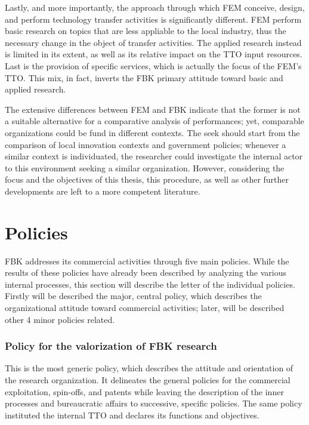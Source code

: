 Lastly, and more importantly, the approach through which FEM conceive, design, and perform technology transfer activities is significantly different. FEM perform basic research on topics that are less appliable to the local industry, thus the necessary change in the object of transfer activities. The applied research instead is limited in its extent, as well as its relative impact on the TTO input resources. Last is the provision of specific services, which is actually the focus of the FEM's TTO. This mix, in fact, inverts the FBK primary attitude toward basic and applied research.

The extensive differences between FEM and FBK indicate that the former is not a suitable alternative for a comparative analysis of performances; yet, comparable organizations could be fund in different contexts. The seek should start from the comparison of local innovation contexts and government policies; whenever a similar context is individuated, the researcher could investigate the internal actor to this environment seeking a similar organization. However, considering the focus and the objectives of this thesis, this procedure, as well as other further developments are left to a more competent literature.

\section{Policies}

FBK addresses its commercial activities through five main policies. While the results of these policies have already been described by analyzing the various internal processes, this section will describe the letter of the individual policies. Firstly will be described the major, central policy, which describes the organizational attitude toward commercial activities; later, will be described other 4 minor policies related.

\subsubsection{Policy for the valorization of FBK research}

This is the most generic policy, which describes the attitude and orientation of the research organization. It delineates the general policies for the commercial exploitation, spin-offs, and patents while leaving the description of the inner processes and bureaucratic affairs to successive, specific policies. The same policy instituted the internal TTO and declares its functions and objectives.

